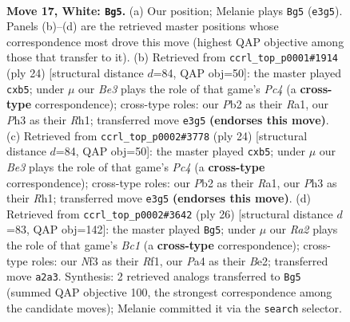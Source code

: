\documentclass[11pt]{article}
\begin{document}
\clearpage

\begin{figure}[p]\centering
\begin{subfigure}{0.46\textwidth}\centering
\resizebox{\linewidth}{!}{%
\newchessgame
\chessboard[
  setfen={rnbqkbr1/5p2/1p1p1n2/p1pP4/P3P2p/2N1BN1P/RP1Q2P1/4KB1R w Kq - 1 17},
  showmover=false,
  pgfstyle=straightmove, color=movearrow, markmove={e3-g5}
]}
\caption{}
\end{subfigure}\hfill
\begin{subfigure}{0.46\textwidth}\centering
\resizebox{\linewidth}{!}{%
\newchessgame
\chessboard[
  setfen={rnbqr3/p4pbk/3p1npp/1ppP4/2P4P/2N1B2N/PP1QBPP1/R3K2R w KQ - 0 13},
  showmover=false,
  pgfstyle=straightmove, color=movearrow, markmove={c4-b5}
]}
\caption{}
\end{subfigure}
\\[4pt]
\begin{subfigure}{0.46\textwidth}\centering
\resizebox{\linewidth}{!}{%
\newchessgame
\chessboard[
  setfen={rnbqr3/p4pbk/3p1npp/1ppP4/2P4P/2N1B2N/PP1QBPP1/R3K2R w KQ - 0 13},
  showmover=false,
  pgfstyle=straightmove, color=movearrow, markmove={c4-b5}
]}
\caption{}
\end{subfigure}\hfill
\begin{subfigure}{0.46\textwidth}\centering
\resizebox{\linewidth}{!}{%
\newchessgame
\chessboard[
  setfen={1rbqr1k1/p1n2pbp/1p1p1np1/2pP4/P1N1P3/2N4P/1P2BPP1/R1BQ1RK1 w - - 3 14},
  showmover=false,
  pgfstyle=straightmove, color=movearrow, markmove={c1-g5}
]}
\caption{}
\end{subfigure}
\caption{\textbf{Move 17, White: \texttt{Bg5}.} (a) Our position; Melanie plays \texttt{Bg5} (\texttt{e3g5}). Panels (b)--(d) are the retrieved master positions whose correspondence most drove this move (highest QAP objective among those that transfer to it). (b) Retrieved from \texttt{ccrl\_top\_p0001\#1914} (ply 24) [structural distance $d$=84, QAP obj=50]: the master played \texttt{cxb5}; under $\mu$ our \emph{Be3} plays the role of that game's \emph{Pc4} (a \textbf{cross-type} correspondence); cross-type roles: our \emph{P}b2 as their \emph{R}a1, our \emph{P}h3 as their \emph{R}h1; transferred move \texttt{e3g5} \textbf{(endorses this move)}. (c) Retrieved from \texttt{ccrl\_top\_p0002\#3778} (ply 24) [structural distance $d$=84, QAP obj=50]: the master played \texttt{cxb5}; under $\mu$ our \emph{Be3} plays the role of that game's \emph{Pc4} (a \textbf{cross-type} correspondence); cross-type roles: our \emph{P}b2 as their \emph{R}a1, our \emph{P}h3 as their \emph{R}h1; transferred move \texttt{e3g5} \textbf{(endorses this move)}. (d) Retrieved from \texttt{ccrl\_top\_p0002\#3642} (ply 26) [structural distance $d$=83, QAP obj=142]: the master played \texttt{Bg5}; under $\mu$ our \emph{Ra2} plays the role of that game's \emph{Bc1} (a \textbf{cross-type} correspondence); cross-type roles: our \emph{N}f3 as their \emph{R}f1, our \emph{P}a4 as their \emph{B}e2; transferred move \texttt{a2a3}. Synthesis: 2 retrieved analogs transferred to \texttt{Bg5} (summed QAP objective 100, the strongest correspondence among the candidate moves); Melanie committed it via the \texttt{search} selector.}
\label{fig:thought-m32}
\end{figure}
\end{document}
